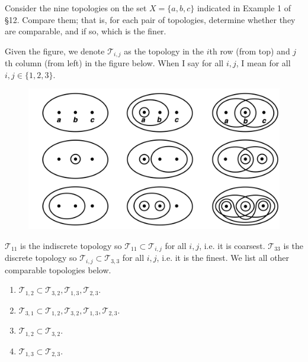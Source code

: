   \begin{exercise}[Munkres 13.2]
    Consider the nine topologies on the set $X = \{a, b, c\}$ indicated in Example 1 of \S12. Compare them; that is, for each pair of topologies, determine whether they are comparable, and if so, which is the finer.
  \end{exercise}
  \begin{solution}[Munkres 13.2] 
    Given the figure, we denote $\mathscr{T}_{i, j}$ as the topology in the $i$th row (from top) and $j$th column (from left) in the figure below. When I say for all $i, j$, I mean for all $i, j \in \{1, 2, 3\}$. 
    \begin{figure}[H]
      \centering 
      \includegraphics[scale=0.3]{img/top.png}
      \caption{} 
      \label{fig:top}
    \end{figure} 
    $\mathscr{T}_{11}$ is the indiscrete topology so $\mathscr{T}_{11} \subset \mathscr{T}_{i, j}$ for all $i, j$, i.e. it is coarsest. $\mathscr{T}_{33}$ is the discrete topology so $\mathscr{T}_{i, j} \subset \mathscr{T}_{3, 3}$ for all $i, j$, i.e. it is the finest. We list all other comparable topologies below. 
    \begin{enumerate}
      \item $\mathscr{T}_{1, 2} \subset \mathscr{T}_{3, 2}, \mathscr{T}_{1, 3}, \mathscr{T}_{2, 3}$. 
      \item $\mathscr{T}_{3, 1} \subset \mathscr{T}_{1, 2}, \mathscr{T}_{3, 2}, \mathscr{T}_{1, 3}, \mathscr{T}_{2, 3}$. 
      \item $\mathscr{T}_{1, 2} \subset \mathscr{T}_{3, 2}$. 
      \item $\mathscr{T}_{1, 3} \subset \mathscr{T}_{2, 3}$. 
    \end{enumerate}
  \end{solution}

